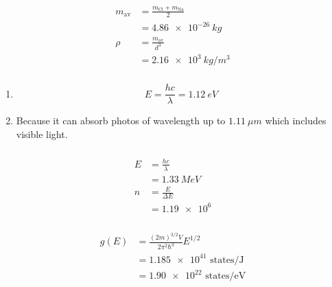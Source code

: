 \documentclass{article}
\begin{document}
\setcounter{subsubsection}{14}
\subsubsection{}

\begin{align*}
  m_\text{av} & = \frac{m_\text{Cl} + m_\text{Na}}{2} \\
              & = \qty{4.86e-26}{kg}                  \\
  \rho        & = \frac{m_\text{av}}{d^3}             \\
              & = \qty{2.16e3}{kg/m^3}
\end{align*}

\setcounter{subsubsection}{16}
\subsubsection{}

\begin{enumerate}
  \item \[E = \frac{h c}{\lambda} = \qty{1.12}{eV}\]

  \item Because it can absorb photos of wavelength up to $\qty{1.11}{\mu m}$ which includes visible light.
\end{enumerate}

\setcounter{subsubsection}{18}
\subsubsection{}

\begin{align*}
  E & = \frac{h c}{\lambda} \\
    & = \qty{1.33}{MeV}     \\
  n & = \frac{E}{\Delta E}  \\
    & = \num{1.19e6}
\end{align*}

\setcounter{subsubsection}{20}
\subsubsection{}

\begin{align*}
  g(E) & = \frac{(2 m)^{3 / 2} V}{2 \pi^2 \hbar^3} E^{1 / 2} \\
       & = \num{1.185e41} \text{ states/J}                   \\
       & = \num{1.90e22} \text{ states/eV}
\end{align*}
\end{document}
